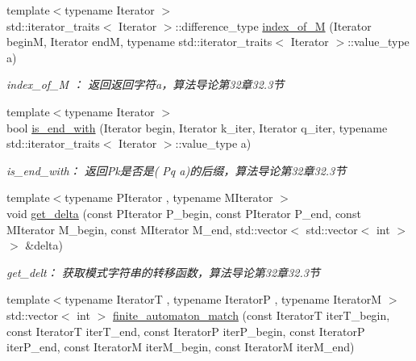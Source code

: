 \begin{DoxyCompactItemize}
\item 
{\footnotesize template$<$typename Iterator $>$ }\\std\+::iterator\+\_\+traits$<$ Iterator $>$\+::difference\+\_\+type \hyperlink{namespace_introduction_to_algorithm_1_1_string_matching_algorithm_acf5d8c82dffae3894905d8091defb315}{index\+\_\+of\+\_\+\+M} (Iterator begin\+M, Iterator end\+M, typename std\+::iterator\+\_\+traits$<$ Iterator $>$\+::value\+\_\+type a)
\begin{DoxyCompactList}\small\item\em index\+\_\+of\+\_\+\+M ： 返回返回字符a，算法导论第32章32.3节 \end{DoxyCompactList}\item 
{\footnotesize template$<$typename Iterator $>$ }\\bool \hyperlink{namespace_introduction_to_algorithm_1_1_string_matching_algorithm_a4267339182491a371210d73c3be57ba1}{is\+\_\+end\+\_\+with} (Iterator begin, Iterator k\+\_\+iter, Iterator q\+\_\+iter, typename std\+::iterator\+\_\+traits$<$ Iterator $>$\+::value\+\_\+type a)
\begin{DoxyCompactList}\small\item\em is\+\_\+end\+\_\+with： 返回\+Pk是否是( Pq a)的后缀，算法导论第32章32.3节 \end{DoxyCompactList}\item 
{\footnotesize template$<$typename P\+Iterator , typename M\+Iterator $>$ }\\void \hyperlink{namespace_introduction_to_algorithm_1_1_string_matching_algorithm_a2096b4363b80c224193aee054d71cf97}{get\+\_\+delta} (const P\+Iterator P\+\_\+begin, const P\+Iterator P\+\_\+end, const M\+Iterator M\+\_\+begin, const M\+Iterator M\+\_\+end, std\+::vector$<$ std\+::vector$<$ int $>$$>$ \&delta)
\begin{DoxyCompactList}\small\item\em get\+\_\+delt： 获取模式字符串的转移函数，算法导论第32章32.3节 \end{DoxyCompactList}\item 
{\footnotesize template$<$typename Iterator\+T , typename Iterator\+P , typename Iterator\+M $>$ }\\std\+::vector$<$ int $>$ \hyperlink{namespace_introduction_to_algorithm_1_1_string_matching_algorithm_aa156c6aecec5459b601ae0069725330e}{finite\+\_\+automaton\+\_\+match} (const Iterator\+T iter\+T\+\_\+begin, const Iterator\+T iter\+T\+\_\+end, const Iterator\+P iter\+P\+\_\+begin, const Iterator\+P iter\+P\+\_\+end, const Iterator\+M iter\+M\+\_\+begin, const Iterator\+M iter\+M\+\_\+end)
$$
\end{DoxyCompactItemize}
